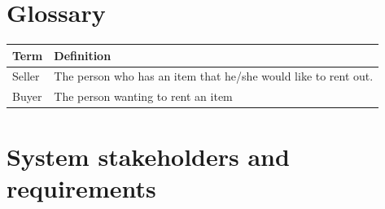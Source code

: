 \documentclass[a4paper,11pt]{report}
\newcommand{\Seller}{ Seller }
\newcommand{\Buyer}{ Buyer }
\begin{document}
\chapter{Glossary}
\label{cha:glossary}
\thispagestyle{fancy}

\begin{tabular}[ht]{| l | l |}
    \hline
    \textbf{Term} & \textbf{Definition} \\ \hline
    \Seller & The person who has an item that he/she would like to rent 
        out. \\ \hline
    \Buyer & The person wanting to rent an item \\ \hline
\end{tabular}

\chapter{System stakeholders and requirements}
\label{cha:syst-stak-requ}
\thispagestyle{fancy}
\end{document}
